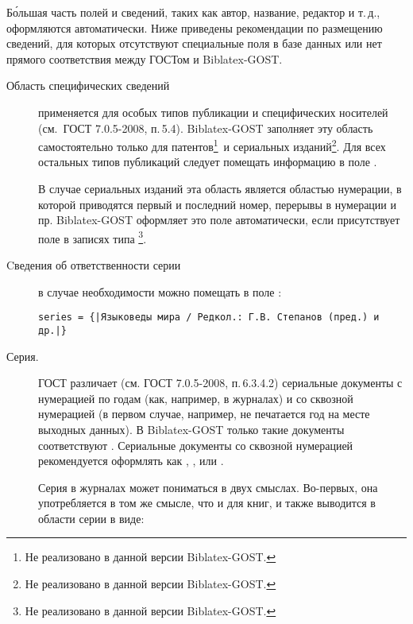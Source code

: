 \documentclass[10pt,a4paper,headings=small,numbers=enddot]{ltxdockit}[2011/03/25]
\newcommand*{\biblatex}{Biblatex\xspace}
\newcommand*{\biblatexgost}{\biblatex-GOST\xspace}
\newcommand*{\gostname}{ГОСТ 7.0.5-2008}
\newcommand*{\gostref}[1]{\gostname, п.\,#1}
\newcommand*{\notimpl}{\footnote{Не реализовано в данной версии \biblatexgost.}}
\begin{document}
Б\'{о}льшая часть полей и сведений, таких как автор, название, редактор и т.\,д., оформляются
автоматически. 
Ниже приведены рекомендации по размещению сведений, для которых отсутствуют
специальные поля в базе данных или нет прямого соответствия между ГОСТом и \biblatexgost.

\begin{description}
%
%
\item[Область специфических сведений] применяется для
особых типов публикации и специфических носителей (см.~\gostref{5.4}). 
\biblatexgost заполняет эту 
область самостоятельно только для патентов\notimpl\ и сериальных изданий\notimpl. 
Для всех остальных типов публикаций
следует помещать информацию в поле . 


В случае сериальных изданий эта область является областью нумерации, в которой приводятся 
первый и последний номер, перерывы в нумерации и пр. \biblatexgost оформляет это поле 
автоматически, если присутствует поле  в записях типа \notimpl.

\item[Cведения об ответственности серии] в случае необходимости можно помещать 
в поле :  
\begin{lstlisting}[style=bibtex,escapechar=|]
series = {|Языковеды мира / Редкол.: Г.В. Степанов (пред.) и др.|}
\end{lstlisting}

\item[Серия.] \label{series}ГОСТ различает (см. \gostref{6.3.4.2}) сериальные документы 
с нумерацией по годам 
(как, например, в журналах) и со сквозной нумерацией (в первом случае, например, 
не печатается год на месте выходных данных). В \biblatexgost только такие документы соответствуют .  Сериальные документы со сквозной нумерацией рекомендуется оформлять как , ,  или . 

Серия в журналах может пониматься в двух смыслах. Во-первых, она употребляется в
том же смысле, что и для книг, и также выводится в области серии в виде:


\end{description}
\end{document}
